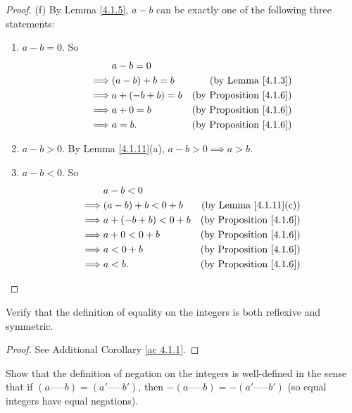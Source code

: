 \begin{proof}{(f)}
By Lemma \ref{4.1.5}, \(a - b\) can be exactly one of the following three statements:
\begin{enumerate}
    \item \(a - b = 0\).
    So
    \begin{align*}
        & a - b = 0 \\
        \implies & (a - b) + b = b & \text{(by Lemma \ref{4.1.3})} \\
        \implies & a + (-b + b) = b & \text{(by Proposition \ref{4.1.6})} \\
        \implies & a + 0 = b & \text{(by Proposition \ref{4.1.6})} \\
        \implies & a = b. & \text{(by Proposition \ref{4.1.6})}
    \end{align*}
    \item \(a - b > 0\).
    By Lemma \ref{4.1.11}(a), \(a - b > 0 \implies a > b\).
    \item \(a - b < 0\).
    So
    \begin{align*}
        & a - b < 0 \\
        \implies & (a - b) + b < 0 + b & \text{(by Lemma \ref{4.1.11}(c))} \\
        \implies & a + (-b + b) < 0 + b & \text{(by Proposition \ref{4.1.6})} \\
        \implies & a + 0 < 0 + b & \text{(by Proposition \ref{4.1.6})} \\
        \implies & a < 0 + b & \text{(by Proposition \ref{4.1.6})} \\
        \implies & a < b. & \text{(by Proposition \ref{4.1.6})}
    \end{align*}
\end{enumerate}
\end{proof}

\exercisesection

\begin{exercise}\label{ex 4.1.1}
Verify that the definition of equality on the integers is both reflexive and symmetric.
\end{exercise}

\begin{proof}
See Additional Corollary \ref{ac 4.1.1}.
\end{proof}

\begin{exercise}\label{ex 4.1.2}
Show that the definition of negation on the integers is well-defined in the sense that if \((a \text{-----} b) = (a' \text{-----} b')\), then \(-(a \text{-----} b) = -(a' \text{-----} b')\)
(so equal integers have equal negations).
\end{exercise}

